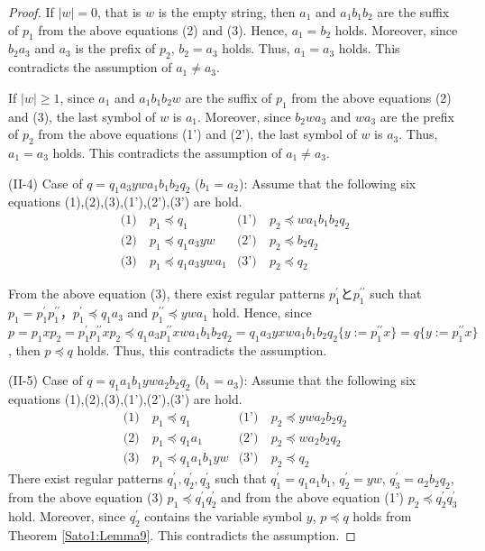 \begin{proof}
\noindent
If $|w|=0$, that is $w$ is the empty string, then $a_{1}$ and $a_{1}b_{1}b_{2}$ are the suffix of $p_{1}$ from the above equations (2) and (3).
Hence, $a_{1}=b_{2}$ holds.
Moreover, since $b_{2}a_{3}$ and $a_{3}$ is the prefix of $p_{2}$, $b_{2}=a_{3}$ holds.
Thus, $a_{1}=a_{3}$ holds.
This contradicts the assumption of $a_{1} \ne a_{3}$.

\noindent
If $|w| \ge 1$, since $a_{1}$ and $a_{1}b_{1}b_{2}w$ are the suffix of $p_{1}$ from the above equations (2) and (3),
the last symbol of $w$ is $a_{1}$.
Moreover, since $b_{2}wa_{3}$ and $wa_{3}$ are the prefix of $p_{2}$ from the above equations (1') and (2'),
the last symbol of $w$ is $a_{3}$.
Thus, $a_{1}=a_{3}$ holds.
This contradicts the assumption of $a_{1} \ne a_{3}$.
\smallskip

\noindent
(II-4) Case of $q=q_{1}a_{3}ywa_{1}b_{1}b_{2}q_{2}$ ($b_{1}=a_{2}$):
Assume that the following six equations (1),(2),(3),(1'),(2'),(3') are hold.
\begin{align*}
\textrm{(1)}~& p_{1} \preceq q_{1} & \textrm{(1')}~& p_{2} \preceq wa_{1}b_{1}b_{2}q_{2} \\
\textrm{(2)}~& p_{1} \preceq q_{1}a_{3}yw & \textrm{(2')}~& p_{2} \preceq b_{2}q_{2} \\
\textrm{(3)}~& p_{1} \preceq q_{1}a_{3}ywa_{1} & \textrm{(3')}~& p_{2} \preceq q_{2}
\end{align*}

\noindent
From the above equation (3), there exist regular patterns $p_{1}^{\prime}$と$p_{1}^{\prime\prime}$ such that $p_{1}=p_{1}^{\prime}p_{1}^{\prime\prime}$，$p_{1}^{\prime} \preceq q_{1}a_{3}$ and $p_{1}^{\prime\prime} \preceq ywa_{1}$ hold.
Hence, since $p=p_{1}xp_{2}=p_{1}^{\prime}p_{1}^{\prime\prime}xp_{2}\preceq q_{1}a_{3}p_{1}^{\prime\prime}xwa_{1}b_{1}b_{2}q_{2}=q_{1}a_{3}yxwa_{1}b_{1}b_{2}q_{2}\{ y := p_{1}^{\prime\prime}x \}=q \{ y := p_{1}^{\prime\prime}x \}$, then $p \preceq q$ holds.
Thus, this contradicts the assumption.
\smallskip

\noindent
(II-5) Case of $q=q_{1}a_{1}b_{1}ywa_{2}b_{2}q_{2}$ ($b_{1}=a_{3}$):
Assume that the following six equations (1),(2),(3),(1'),(2'),(3') are hold.
\begin{align*}
\textrm{(1)}~& p_{1} \preceq q_{1} & \textrm{(1')}~& p_{2} \preceq ywa_{2}b_{2}q_{2} \\
\textrm{(2)}~& p_{1} \preceq q_{1}a_{1} & \textrm{(2')}~& p_{2} \preceq wa_{2}b_{2}q_{2} \\
\textrm{(3)}~& p_{1} \preceq q_{1}a_{1}b_{1}yw & \textrm{(3')}~& p_{2} \preceq q_{2}
\end{align*}
\noindent
There exist regular patterns $q_{1}^{\prime}, q_{2}^{\prime}, q_{3}^{\prime}$ such that $q_{1}^{\prime}=q_{1}a_{1}b_{1}$, $q_{2}^{\prime}=yw$, $q_{3}^{\prime}=a_{2}b_{2}q_{2}$, from the above equation (3) $p_{1} \preceq q_{1}^{\prime}q_{2}^{\prime}$ and from the above equation (1') $p_{2} \preceq q_{2}^{\prime}q_{3}^{\prime}$ hold.
Moreover, since $q_{2}^{\prime}$ contains the variable symbol $y$, $p\preceq q$ holds from Theorem \ref{Sato1:Lemma9}.
This contradicts the assumption.
\end{proof}

